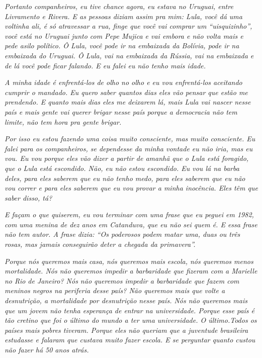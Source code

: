 \emph{Portanto companheiros, eu tive chance agora, eu estava no Uruguai,
entre Livramento e Rivera. E as pessoas diziam assim pra mim: Lula, você
dá uma voltinha ali, é só atravessar a rua, finge que você vai comprar
um ``uisquizinho'', você está no Uruguai junto com Pepe Mujica e vai
embora e não volta mais e pede asilo político. Ô Lula, você pode ir na
embaixada da Bolívia, pode ir na embaixada do Uruguai. Ô Lula, vai na
embaixada da Rússia, vai na embaixada e de lá você pode ficar falando. E
eu falei eu não tenho mais idade.}

\emph{A minha idade é enfrentá-los de olho no olho e eu vou enfrentá-los
aceitando cumprir o mandado. Eu quero saber quantos dias eles vão pensar
que estão me prendendo. E quanto mais dias eles me deixarem lá, mais
Lula vai nascer nesse país e mais gente vai querer brigar nesse país
porque a democracia não tem limite, não tem hora pra gente brigar.}

\emph{Por isso eu estou fazendo uma coisa muito consciente, mas muito
consciente. Eu falei para os companheiros, se dependesse da minha
vontade eu não iria, mas eu vou. Eu vou porque eles vão dizer a partir
de amanhã que o Lula está foragido, que o Lula está escondido. Não, eu
não estou escondido. Eu vou lá na barba deles, para eles saberem que eu
não tenho medo, para eles saberem que eu não vou correr e para eles
saberem que eu vou provar a minha inocência. Eles têm que saber disso,
tá?}

\emph{E façam o que quiserem, eu vou terminar com uma frase que eu
peguei em 1982, com uma menina de dez anos em Catanduva, que eu não sei
quem é. E essa frase não tem autor. A frase dizia: ``Os poderosos podem
matar uma, duas ou três rosas, mas jamais conseguirão deter a chegada da
primavera''.}

\emph{Porque nós queremos mais casa, nós queremos mais escola, nós
queremos menos mortalidade. Nós não queremos impedir a barbaridade que
fizeram com a Marielle no Rio de Janeiro? Nós não queremos impedir a
barbaridade que fazem com meninos negros na periferia desse país? Não
queremos mais que volte a desnutrição, a mortalidade por desnutrição
nesse país. Nós não queremos mais que um jovem não tenha esperança de
entrar na universidade. Porque esse país é tão cretino que foi o último
do mundo a ter uma universidade. O último.Todos os países mais pobres
tiveram. Porque eles não queriam que a juventude brasileira estudasse e
falaram que custava muito fazer escola. E se perguntar quanto custou não
fazer há 50 anos atrás.}

